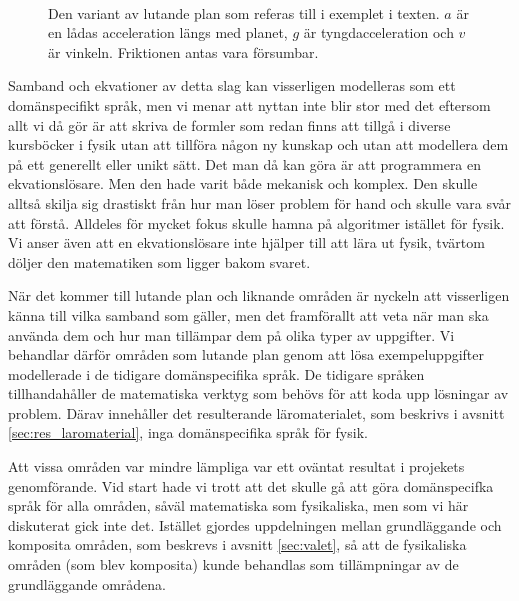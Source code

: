 \begin{draft}
\begin{figure}[tph]
  \centering
  \caption{Den variant av lutande plan som referas till i exemplet i texten. $a$
  är en lådas acceleration längs med planet, $g$ är tyngdacceleration och $v$ är
  vinkeln. Friktionen antas vara försumbar.}~\label{fig:lutande_plan}
\end{figure}

Samband och ekvationer av detta slag kan visserligen modelleras som ett domänspecifikt
språk, men vi menar att nyttan inte blir stor med det eftersom allt vi då gör är
att skriva de formler som redan finns att tillgå i diverse kursböcker i fysik
utan att tillföra någon ny kunskap och utan att modellera dem på ett generellt
eller unikt sätt. Det man då kan göra är att programmera en ekvationslösare. Men
den hade varit både mekanisk och komplex. Den skulle alltså skilja sig
drastiskt från hur man löser problem för hand och skulle vara svår att förstå.
Alldeles för mycket fokus skulle hamna på algoritmer istället för fysik. Vi
anser även att en ekvationslösare inte hjälper till att lära ut fysik, tvärtom
döljer den matematiken som ligger bakom svaret.

När det kommer till lutande plan och liknande områden är nyckeln att visserligen
känna till vilka samband som gäller, men det framförallt att veta när man ska
använda dem och hur man tillämpar dem på olika typer av uppgifter. Vi behandlar
därför områden som lutande plan genom att lösa exempeluppgifter modellerade i de
tidigare domänspecifika språk. De tidigare språken tillhandahåller de matematiska
verktyg som behövs för att koda upp lösningar av problem. Därav innehåller det resulterande läromaterialet, som beskrivs i avsnitt \ref{sec:res_laromaterial}, inga domänspecifika språk för fysik.

Att vissa områden var mindre lämpliga var ett oväntat resultat i projekets genomförande. Vid start hade vi trott att det skulle gå att göra domänspecifka språk för alla områden, såväl matematiska som fysikaliska, men som vi här diskuterat gick inte det. Istället gjordes uppdelningen mellan grundläggande och komposita områden, som beskrevs i avsnitt \ref{sec:valet}, så att de fysikaliska områden (som blev komposita) kunde behandlas som tillämpningar av de grundläggande områdena.


\end{draft}
